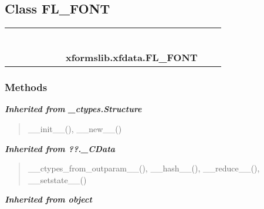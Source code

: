 \subsection{Class FL\_FONT}

    \label{xformslib:xfdata:FL_FONT}
\begin{tabular}{cccccccccc}
\multicolumn{2}{r}{\settowidth{\BCL}{object}\multirow{2}{\BCL}{object}}
&&
&&
&&
  \\\cline{3-3}
  &&\multicolumn{1}{c|}{}
&&
&&
&&
  \\
\multicolumn{4}{r}{\settowidth{\BCL}{??.\_CData}\multirow{2}{\BCL}{??.\_CData}}
&&
&&
  \\\cline{5-5}
  &&&&\multicolumn{1}{c|}{}
&&
&&
  \\
\multicolumn{6}{r}{\settowidth{\BCL}{\_ctypes.Structure}\multirow{2}{\BCL}{\_ctypes.Structure}}
&&
  \\\cline{7-7}
  &&&&&&\multicolumn{1}{c|}{}
&&
  \\
&&&&&&\multicolumn{2}{l}{\textbf{xformslib.xfdata.FL\_FONT}}
\end{tabular}



  \subsubsection{Methods}


\large{\textbf{\textit{Inherited from \_ctypes.Structure}}}

\begin{quote}
\_\_init\_\_(), \_\_new\_\_()
\end{quote}

\large{\textbf{\textit{Inherited from ??.\_CData}}}

\begin{quote}
\_\_ctypes\_from\_outparam\_\_(), \_\_hash\_\_(), \_\_reduce\_\_(), \_\_setstate\_\_()
\end{quote}

\large{\textbf{\textit{Inherited from object}}}


